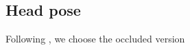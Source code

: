 \subsection{Head pose}
Following \cite{beyer2015biternion,prokudin2018deep}, we choose the occluded version 